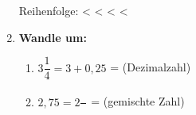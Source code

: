 \begin{enumerate}[label=\arabic*.]
    Reihenfolge: \underline{\hspace{1.5cm}} < \underline{\hspace{1.5cm}} < \underline{\hspace{1.5cm}} < \underline{\hspace{1.5cm}} < \underline{\hspace{1.5cm}}

    \vspace{0.5cm}

    \item \textbf{Wandle um:}
    \begin{enumerate}[label=\alph*)]
        \item $3\dfrac{1}{4} = 3 + 0,25$ = \underline{\hspace{3cm}} (Dezimalzahl)
        \item $2,75 = 2\dfrac{\phantom{3}}{\phantom{4}}$ = \underline{\hspace{3cm}} (gemischte Zahl)
    \end{enumerate}
\end{enumerate}
